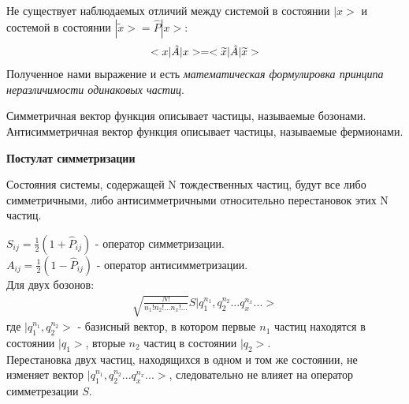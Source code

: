 \documentclass[__main__.tex]{subfiles}
\begin{document}
Не существует наблюдаемых отличий между системой в состоянии $|x>$ и состемой в состоянии $|\widetilde{x}> = \hat{P}|x>$:
\begin{gather}
\llabel{ch02:1}
<x|\hat{A}|x> = <\widetilde{x}|\hat{A}|\widetilde{x}>
\end{gather}
Полученное нами выражение  и есть \textit{математическая формулировка принципа неразличимости одинаковых частиц}.
\begin{definition}
Симметричная вектор функция описывает частицы, называемые бозонами.\\
Антисимметричная вектор функция описывает частицы, называемые фермионами.\\
\end{definition}
\textbf{Постулат симметризации}
\begin{definition}
Состояния системы, содержащей N тождественных частиц, будут все либо симметричными, либо антисимметричными относительно перестановок этих N частиц.\\
\end{definition}
$S_{ij} = \frac{1}{2}(1+\hat{P}_{ij})$ - оператор симметризации.\\
$A_{ij} = \frac{1}{2}(1-\hat{P}_{ij})$ - оператор антисимметризации.\\
Для двух бозонов:\\
\begin{gather}
\sqrt{\frac{N!}{n_1!n_2!...n_x!...}}S|q_1^{n_1},q_2^{n_2}...q_x^{n_x}...>
\end{gather}
где $|q_1^{n_1},q_2^{n_2}>$ - базисный вектор, в котором первые $n_1$ частиц находятся в состоянии $|q_1>$, вторые $n_2$ частиц в состоянии $|q_2>$.\\
Перестановка двух частиц, находящихся в одном и том же состоянии, не изменяет вектор $|q_1^{n_1},q_2^{n_2}...q_x^{n_x}...>$, следовательно не влияет на оператор симметрезации $S$.\\
\end{document}

